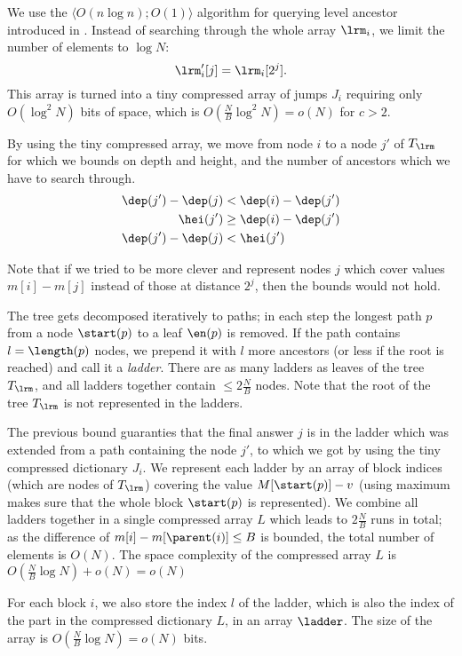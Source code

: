 \bigbreak

We use the $\langle O(n \log n); O(1) \rangle$ algorithm for querying level ancestor introduced in \cite{bender2004level}.
Instead of searching through the whole array $\lrm_i$, we limit the number of elements to $\log N$:
$$ \lrm'_i[j] = \lrm_i[2^j]. $$
This array is turned into a tiny compressed array of jumps $J_i$ requiring only $O(\log^2 N)$ bits of space, which is $O\left(\frac{N}{B} \log^2 N\right) = o(N)$ for $c > 2$.

By using the tiny compressed array, we move from node $i$ to a node $j'$ of $T_{\lrm}$ for which we bounds on depth and height, and the number of ancestors which we have to search through.
\begin{align*}
	\dep(j') - \dep(j) &< \dep(i) - \dep(j') \\
	\hei(j') &\ge \dep(i) - \dep(j') \\
	\dep(j') - \dep(j) &< \hei(j')
\end{align*}

Note that if we tried to be more clever and represent nodes $j$ which cover values $m[i] - m[j]$ instead of those at distance $2^j$, then the bounds would not hold.

\bigbreak

The tree gets decomposed iteratively to paths; in each step the longest path $p$ from a node $\start(p)$ to a leaf $\en(p)$ is removed.
If the path contains $l = \length(p)$ nodes, we prepend it with $l$ more ancestors (or less if the root is reached) and call it a \emph{ladder}.
There are as many ladders as leaves of the tree $T_{\lrm}$, and all ladders together contain $\le 2 \frac{N}{B}$ nodes.
Note that the root of the tree $T_{\lrm}$ is not represented in the ladders.

The previous bound guaranties that the final answer $j$ is in the ladder which was extended from a path containing the node $j'$, to which we got by using the tiny compressed dictionary $J_i$.
We represent each ladder by an array of block indices (which are nodes of $T_{\lrm}$) covering the value $M[\start(p)] - v$ (using maximum makes sure that the whole block $\start(p)$ is represented).
We combine all ladders together in a single compressed array $L$ which leads to $2 \frac{N}{B}$ runs in total; as the difference of $m[i] - m[\parent(i)] \le B$ is bounded, the total number of elements is $O(N)$.
The space complexity of the compressed array $L$ is $O\left(\frac{N}{B} \log N\right) + o(N) = o(N)$

For each block $i$, we also store the index $l$ of the ladder, which is also the index of the part in the compressed dictionary $L$, in an array $\ladder$.
The size of the array is $O\left(\frac{N}{B} \log N\right) = o(N)$ bits.

